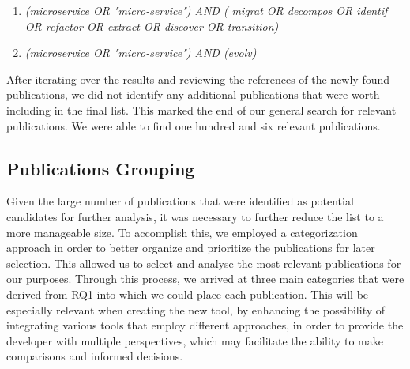 \documentclass[conference]{IEEEtran}
\begin{document}
\begin{enumerate}
  \item \emph{(microservice OR "micro-service") AND ( migrat OR decompos OR
    identif OR refactor OR extract OR discover OR transition)}
  \item \emph{(microservice OR "micro-service") AND (evolv)}
\end{enumerate}

After iterating over the results and reviewing the references of the newly
found publications, we did not identify any additional publications that were
worth including in the final list. This marked the end of our general search
for relevant publications. We were able to find one hundred and six relevant
publications.

\subsection{Publications Grouping}

Given the large number of publications that were identified as potential
candidates for further analysis, it was necessary to further reduce the list to
a more manageable size. To accomplish this, we employed a categorization
approach in order to better organize and prioritize the publications for later
selection. This allowed us to select and analyse the most relevant publications
for our purposes. Through this process, we arrived at three main categories
that were derived from RQ1 into which we could place each publication. This
will be especially relevant when creating the new tool, by enhancing the
possibility of integrating various tools that employ different approaches, in
order to provide the developer with multiple perspectives, which may facilitate
the ability to make comparisons and informed decisions.
\end{document}
